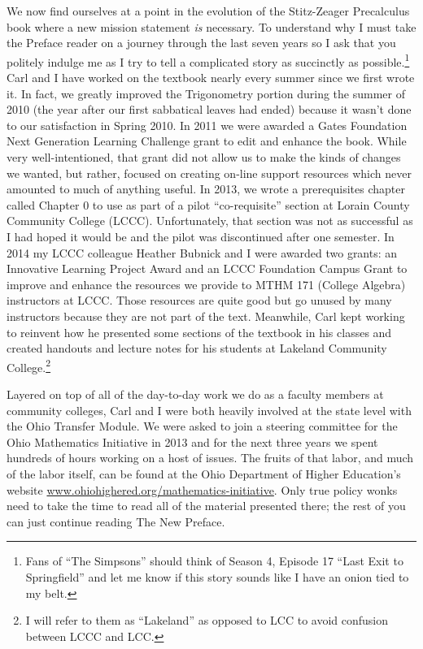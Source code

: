 \documentclass{ximera}
\begin{document}
\noindent We now find ourselves at a point in the evolution of the Stitz-Zeager Precalculus book where a new mission statement \emph{is} necessary.  To understand why I must take the Preface reader on a journey through the last seven years so I ask that you politely indulge me as I try to tell a complicated story as succinctly as possible.\footnote{Fans of ``The Simpsons'' should think of Season 4, Episode 17 ``Last Exit to Springfield'' and let me know if this story sounds like I have an onion tied to my belt.}  Carl and I have worked on the textbook nearly every summer since we first wrote it.  In fact, we greatly improved the Trigonometry portion during the summer of 2010 (the year after our first sabbatical leaves had ended) because it wasn’t done to our satisfaction in Spring 2010.  In 2011 we were awarded a Gates Foundation Next Generation Learning Challenge grant to edit and enhance the book.  While very well-intentioned, that grant did not allow us to make the kinds of changes we wanted, but rather, focused on creating on-line support resources which never amounted to much of anything useful.  In 2013, we wrote a prerequisites chapter called Chapter 0 to use as part of a pilot ``co-requisite'' section at Lorain County Community College (LCCC). Unfortunately, that section was not as successful as I had hoped it would be and the pilot was discontinued after one semester.  In 2014 my LCCC colleague Heather Bubnick and I were awarded two grants: an Innovative Learning Project Award and an LCCC Foundation Campus Grant to improve and enhance the resources we provide to MTHM 171 (College Algebra) instructors at LCCC.  Those resources are quite good but go unused by many instructors because they are not part of the text.  Meanwhile, Carl kept working to reinvent how he presented some sections of the textbook in his classes and created handouts and lecture notes for his students at Lakeland Community College.\footnote{I will refer to them as ``Lakeland'' as opposed to LCC to avoid confusion between LCCC and LCC.} 

\medskip

\noindent Layered on top of all of the day-to-day work we do as a faculty members at community colleges, Carl and I were both heavily involved at the state level with the Ohio Transfer Module.  We were asked to join a steering committee for the Ohio Mathematics Initiative in 2013 and for the next three years we spent hundreds of hours working on a host of issues.  The fruits of that labor, and much of the labor itself, can be found at the Ohio Department of Higher Education's website \href{https://www.ohiohighered.org/mathematics-initiative}{www.ohiohighered.org/mathematics-initiative}.  Only true policy wonks need to take the time to read all of the material presented there; the rest of you can just continue reading The New Preface.
\end{document}
